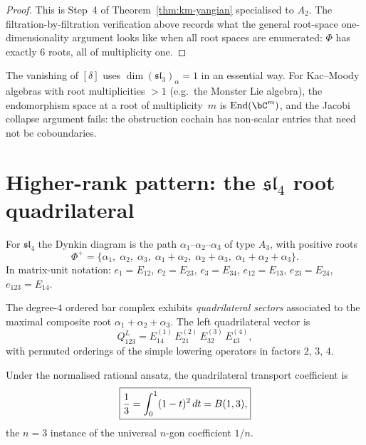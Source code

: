\begin{proof}
This is Step~4 of Theorem~\ref{thm:km-yangian} specialised to
$A_2$. The filtration-by-filtration verification above records
what the general root-space one-dimensionality argument looks like
when all root spaces are enumerated: $\Phi$ has exactly $6$ roots,
all of multiplicity one.
\end{proof}

\begin{remark}
\label{rem:root-multiplicities}
The vanishing of $[\delta]$ uses $\dim(\mathfrak{sl}_3)_\alpha=1$
in an essential way. For Kac--Moody algebras with root multiplicities
$>1$ (e.g.\ the Monster Lie algebra), the endomorphism space at a
root of multiplicity~$m$ is $\operatorname{End}(\bC^m)$, and
the Jacobi collapse argument fails: the obstruction cochain has
non-scalar entries that need not be coboundaries.
\end{remark}

\section{Higher-rank pattern: the \texorpdfstring{$\mathfrak{sl}_4$}{sl(4)} root quadrilateral}
\label{sec:sl4-quadrilateral}

For $\mathfrak{sl}_4$ the Dynkin diagram is the path
$\alpha_1\text{--}\alpha_2\text{--}\alpha_3$ of type $A_3$, with
positive roots
\[
\Phi^+=\{\alpha_1,\;\alpha_2,\;\alpha_3,\;
\alpha_1{+}\alpha_2,\;\alpha_2{+}\alpha_3,\;
\alpha_1{+}\alpha_2{+}\alpha_3\}.
\]
In matrix-unit notation: $e_1=E_{12}$, $e_2=E_{23}$, $e_3=E_{34}$,
$e_{12}=E_{13}$, $e_{23}=E_{24}$, $e_{123}=E_{14}$.

\begin{definition}
\label{def:sl4-quadrilateral}
The degree-$4$ ordered bar complex exhibits \emph{quadrilateral sectors}
associated to the maximal composite root $\alpha_1+\alpha_2+\alpha_3$.
The left quadrilateral vector is
\[
Q^L_{123}
=E_{14}^{(1)}\,E_{21}^{(2)}\,E_{32}^{(3)}\,E_{43}^{(4)},
\]
with permuted orderings of the simple lowering operators in
factors $2$, $3$, $4$.
\end{definition}

\begin{theorem}
\label{thm:sl4-quadrilateral}
Under the normalised rational ansatz, the quadrilateral transport
coefficient is
\[
\boxed{%
\frac{1}{3}
=
\int_0^1(1-t)^2\,dt
=
B(1,3),
}
\]
the $n=3$ instance of the universal $n$-gon coefficient $1/n$.
\end{theorem}

